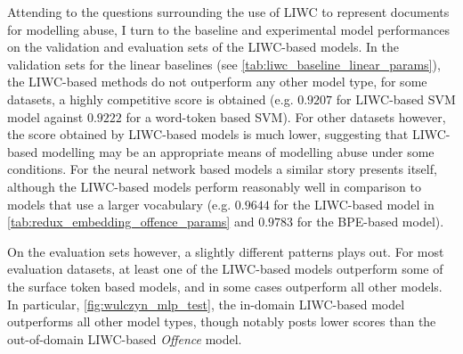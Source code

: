 Attending to the questions surrounding the use of LIWC to represent documents for modelling abuse, I turn to the baseline and experimental model performances on the validation and evaluation sets of the LIWC-based models. In the validation sets for the linear baselines (see \cref{tab:liwc_baseline_linear_params}), the LIWC-based methods do not outperform any other model type, for some datasets, a highly competitive score is obtained (e.g. $0.9207$ for LIWC-based SVM model against $0.9222$ for a word-token based SVM). For other datasets however, the score obtained by LIWC-based models is much lower, suggesting that LIWC-based modelling may be an appropriate means of modelling abuse under some conditions.
For the neural network based models a similar story presents itself, although the LIWC-based models perform reasonably well in comparison to models that use a larger vocabulary (e.g. $0.9644$ for the LIWC-based model in \cref{tab:redux_embedding_offence_params} and $0.9783$ for the BPE-based model).

On the evaluation sets however, a slightly different patterns plays out. For most evaluation datasets, at least one of the LIWC-based models outperform some of the surface token based models, and in some cases outperform all other models. In particular, \cref{fig:wulczyn_mlp_test}, the in-domain LIWC-based model outperforms all other model types, though notably posts lower scores than the out-of-domain LIWC-based \textit{Offence} model.

